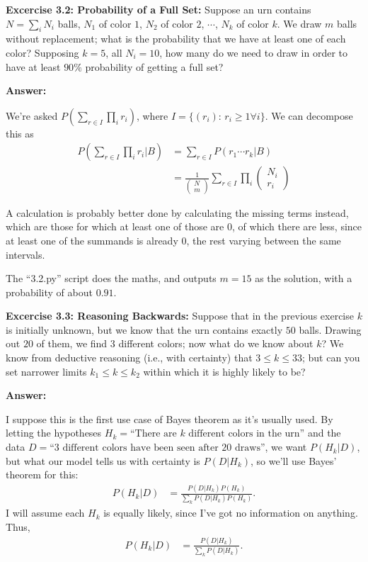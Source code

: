 \documentclass{article}
\begin{document}
\textbf{Excercise 3.2: Probability of a Full Set: }Suppose an urn contains $N=\sum_iN_i$ balls, $N_1$ of color $1$, $N_2$ of color $2$, $\cdots$, $N_k$ of color $k$. We draw $m$ balls without replacement; what is the probability that we have at least one of each color? Supposing $k=5$, all $N_i=10$, how many do we need to draw in order to have at least $90\%$ probability of getting a full set?

\textbf{Answer: }

We're asked $P\left(\sum_{r\in I}\prod_ir_i\right)$, where $I=\{(r_i):\,r_i\geq1\forall i\}$. We can decompose this as 
\begin{align}
	P\left(\sum_{r\in I}\prod_ir_i|B\right)&=\sum_{r\in I}P\left(r_1\cdots r_k|B\right)\\
	&=\frac1{\begin{pmatrix}N\\m\end{pmatrix}}\sum_{r\in I}\prod_i\begin{pmatrix}N_i\\r_i\end{pmatrix}
\end{align}

A calculation is probably better done by calculating the missing terms instead, which are those for which at least one of those are $0$, of which there are less, since at least one of the summands is already $0$, the rest varying between the same intervals.

The ``3.2.py'' script does the maths, and outputs $m=15$ as the solution, with a probability of about $0.91$.

\textbf{Excercise 3.3: Reasoning Backwards: }Suppose that in the previous exercise $k$ is initially unknown, but we know that the urn contains exactly $50$ balls. Drawing out $20$ of them, we find $3$ different colors; now what do we know about $k$? We know from deductive reasoning (i.e., with certainty) that $3\leq k\leq 33$; but can you set narrower limits $k_1\leq k\leq k_2$ within which it is highly likely to be?

\textbf{Answer:}

I suppose this is the first use case of Bayes theorem as it's usually used. By letting the hypotheses $H_k=\text{``There are $k$ different colors in the urn''}$ and the data $D=\text{``3 different colors have been seen after 20 draws''}$, we want $P(H_k|D)$, but what our model tells us with certainty is $P(D|H_k)$, so we'll use Bayes' theorem for this:
\begin{align}
	P(H_k|D)&=\frac{P(D|H_k)P(H_k)}{\sum_kP(D|H_k)P(H_k)}.
\end{align}
I will assume each $H_k$ is equally likely, since I've got no information on anything. Thus,
\begin{align}
	P(H_k|D)&=\frac{P(D|H_k)}{\sum_kP(D|H_k)}.
\end{align}
\end{document}
